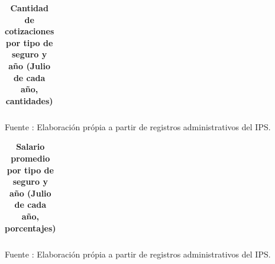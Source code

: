 \begin{table}[H]
\begin{center}
\scriptsize     
\caption{\bf{Cantidad de cotizaciones por tipo de seguro y año (Julio de cada año, cantidades)}}
\begin{tabular}{l|rrrrrrrrrrrrr}

\end{tabular}
                    \item Fuente : Elaboración própia a partir de registros administrativos del IPS.
\end{center}
\end{table}

\begin{table}[H]
\begin{center}
\scriptsize     
\caption{\bf{Salario promedio por tipo de seguro y año (Julio de cada año, porcentajes)}}
\begin{tabular}{l|rrrrrrrrrrrrr}

\end{tabular}
                    \item Fuente : Elaboración própia a partir de registros administrativos del IPS.
\end{center}
\end{table}
